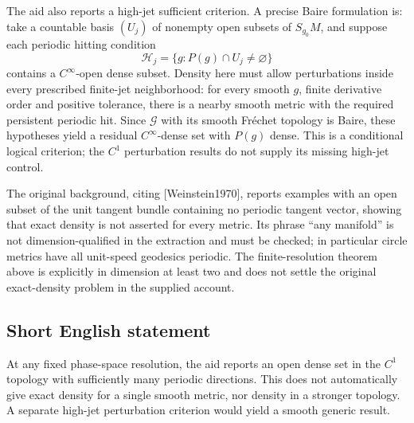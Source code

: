 \documentclass[11pt]{article}
\begin{document}
The aid also reports a high-jet sufficient criterion. A precise Baire formulation is: take a countable basis \((U_j)\) of nonempty open subsets of \(S_{g_0}M\), and suppose each periodic hitting condition
\[
 \mathcal H_j=\{g:P(g)\cap U_j\ne\varnothing\}
\]
contains a \(C^\infty\)-open dense subset. Density here must allow perturbations inside every prescribed finite-jet neighborhood: for every smooth \(g\), finite derivative order and positive tolerance, there is a nearby smooth metric with the required persistent periodic hit. Since \(\mathcal G\) with its smooth Fréchet topology is Baire, these hypotheses yield a residual \(C^\infty\)-dense set with \(P(g)\) dense. This is a conditional logical criterion; the \(C^1\) perturbation results do not supply its missing high-jet control.

The original background, citing [Weinstein1970], reports examples with an open subset of the unit tangent bundle containing no periodic tangent vector, showing that exact density is not asserted for every metric. Its phrase ``any manifold'' is not dimension-qualified in the extraction and must be checked; in particular circle metrics have all unit-speed geodesics periodic. The finite-resolution theorem above is explicitly in dimension at least two and does not settle the original exact-density problem in the supplied account.
\subsection{Short English statement}
At any fixed phase-space resolution, the aid reports an open dense set in the \(C^1\) topology with sufficiently many periodic directions. This does not automatically give exact density for a single smooth metric, nor density in a stronger topology. A separate high-jet perturbation criterion would yield a smooth generic result.
\end{document}
